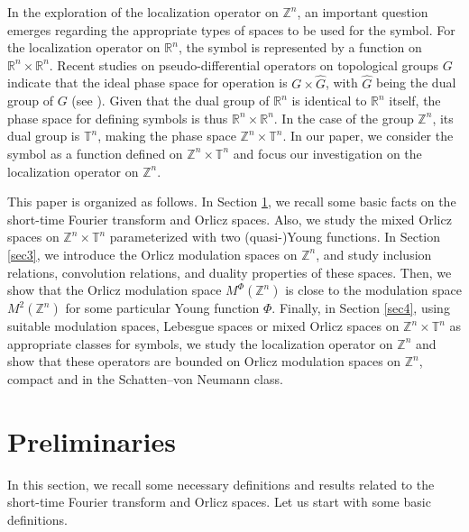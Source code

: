 \documentclass[a4paper,11pt, reqno]{amsart}
\theoremstyle{plain}
\theoremstyle{definition}
\theoremstyle{remark}
\def \Z{{\mathbb Z}}
\def \T{{\mathbb T}}
\begin{document}
In the exploration of the localization operator on $\mathbb{Z}^n$, an important question emerges regarding the appropriate types of spaces to be used for the symbol. For the localization operator on $\mathbb{R}^{n}$, the symbol is represented by a function on $\mathbb{R}^{n} \times \mathbb{R}^{n} $. Recent studies on pseudo-differential operators on topological groups $G$ indicate that the ideal phase space for operation is $G  \times \widehat{G}$, with $\widehat{G}$ being the dual group of $G$ (see \cite{mol19}). Given that the dual group of $\mathbb{R}^{n}$ is identical to $\mathbb{R}^{n}$ itself, the phase space for defining symbols is thus $\mathbb{R}^{n} \times \mathbb{R}^{n}$. In the case of the group $\mathbb{Z}^n$, its dual group is $\T^n$,  making the phase space $\mathbb{Z}^n \times \T^n$. In our paper, we consider the symbol as a function defined on $\mathbb{Z}^n \times \T^n$ and focus our investigation on the localization operator on $\mathbb{Z}^n$.

This paper is organized as follows. In Section \ref{sec2}, we recall some basic facts on the short-time Fourier transform and Orlicz spaces. Also, we study the mixed Orlicz spaces on $ \Z^n \times \T^n $ parameterized with two (quasi-)Young functions. In Section \ref{sec3}, we introduce the Orlicz modulation spaces on $\Z^n$, and study inclusion relations, convolution relations, and duality properties of these spaces. Then, we show that the Orlicz modulation space $M^{\Phi}(\Z^n)$ is close to the modulation space $M^{2}(\Z^n)$ for some particular Young function $\Phi$. Finally, in Section \ref{sec4}, using suitable modulation spaces, Lebesgue spaces or mixed Orlicz spaces on $\Z^n \times \T^n$ as appropriate classes for symbols, we study the localization operator on $\Z^n$ and show that these operators are bounded on Orlicz modulation spaces on $\Z^n$, compact and in the Schatten--von Neumann class.
 
\section{Preliminaries}\label{sec2} 

In this section, we recall some necessary definitions and results related to the short-time Fourier transform and Orlicz spaces. Let us start with some basic definitions.
\end{document}
